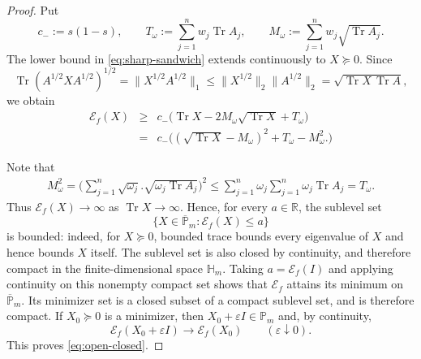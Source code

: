 \documentclass[11pt]{amsart}
\theoremstyle{definition}
\theoremstyle{remark}
\newcommand{\Pm}{\mathbb P_m}
\newcommand{\Hm}{\mathbb H_m}
\newcommand{\Tr}{\operatorname{Tr}}
\begin{document}
	\begin{proof}
		Put
		\[
		c_-:=s(1-s),\qquad
		T_\omega:=\sum_{j=1}^n w_j\Tr A_j,\qquad
		M_\omega:=\sum_{j=1}^n w_j\sqrt{\Tr A_j}.
		\]
		The lower bound in \eqref{eq:sharp-sandwich} extends continuously to
		$X\succeq0$. Since
		\[
		\Tr(A^{1/2}XA^{1/2})^{1/2}
		=\|X^{1/2}A^{1/2}\|_1
		\le \|X^{1/2}\|_2\|A^{1/2}\|_2
		=\sqrt{\Tr X\,\Tr A},
		\]
	      we obtain
		\begin{eqnarray} \label{eq:coercivity}
				\mathcal E_f(X)
			&\ge& c_-\bigl(\Tr X-2M_\omega\sqrt{\Tr X}+T_\omega\bigr)\\ \nonumber
			&=&c_- \Big( (\sqrt{\Tr X}-M_\omega)^2 +T_{\omega} -M^2_{\omega}.   \Big)
			\end{eqnarray}
		
		Note that
		\begin{eqnarray*}
			M_{\omega}^2 = \Big( \sum_{j=1}^n \sqrt{\omega_j}. \sqrt{\omega_j \Tr A_j} \Big)^2 \le \sum_{j=1}^n \omega_j \sum_{j=1}^n \omega_j \Tr A_j=T_{\omega}.
			\end{eqnarray*}
Thus $\mathcal{E}_f(X) \rightarrow \infty$ as $\operatorname{Tr} X \rightarrow \infty$. 
		Hence, for every $a\in\mathbb R$, the sublevel set
		\[
		\{X\in\overline{\mathbb{P}}_m:\mathcal E_f(X)\le a\}
		\]
		is bounded: indeed, for $X\succeq0$, bounded trace bounds every
		eigenvalue of $X$ and hence bounds $X$ itself.  The sublevel set is also
		closed by continuity, and therefore compact in the finite-dimensional
		space $\Hm$.  Taking
		$a=\mathcal E_f(I)$ and applying continuity on this nonempty compact set
		shows that $\mathcal E_f$ attains its minimum on $\overline{\mathbb{P}}_m$.
		Its minimizer set is a closed subset of a compact sublevel set, and is
		therefore compact.  If $X_0\succeq0$ is a minimizer, then
		$X_0+\varepsilon I\in\Pm$ and, by continuity,
		\[
		\mathcal E_f(X_0+\varepsilon I)
		\longrightarrow \mathcal E_f(X_0)
		\qquad (\varepsilon\downarrow0).
		\]
		This proves \eqref{eq:open-closed}.
		

\end{proof}
\end{document}
